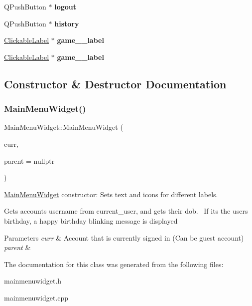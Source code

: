 \begin{DoxyCompactItemize}
Q\+Push\+Button $\ast$ {\bfseries logout}
\item 
\mbox{\label{classMainMenuWidget_a44f2dc5e221e5f2edfeac135b0a54220}} 
Q\+Push\+Button $\ast$ {\bfseries history}
\item 
\mbox{\label{classMainMenuWidget_abf23eb9532e4cbca4a15cc9a17b79b87}} 
\hyperlink{classClickableLabel}{Clickable\+Label} $\ast$ {\bfseries game\+\_\+\_\+label}
\item 
\mbox{\label{classMainMenuWidget_acb10152f41acad8f1bb3d7308e341dcb}} 
\hyperlink{classClickableLabel}{Clickable\+Label} $\ast$ {\bfseries game\+\_\+\_\+label}
\end{DoxyCompactItemize}


\subsection{Constructor \& Destructor Documentation}
\mbox{\label{classMainMenuWidget_abedbc5ac35ef230d4cbcd5ebcffaa780}} 
\subsubsection{\texorpdfstring{Main\+Menu\+Widget()}{MainMenuWidget()}}
{\footnotesize\ttfamily Main\+Menu\+Widget\+::\+Main\+Menu\+Widget (\begin{DoxyParamCaption}\item[{\hyperlink{classAccounts}{Accounts} $\ast$}]{curr,  }\item[{Q\+Widget $\ast$}]{parent = {\ttfamily nullptr} }\end{DoxyParamCaption})\hspace{0.3cm}{\ttfamily [explicit]}}



\hyperlink{classMainMenuWidget}{Main\+Menu\+Widget} constructor\+: Sets text and icons for different labels. 

Gets account\textquotesingle{}s username from current\+\_\+user, and gets their dob.~\newline
If its the user\textquotesingle{}s birthday, a happy birthday blinking message is displayed 
\begin{DoxyParams}{Parameters}
{\em curr} & Account that is currently signed in (Can be guest account) \\
\hline
{\em parent} & \\
\hline
\end{DoxyParams}


The documentation for this class was generated from the following files\+:\begin{DoxyCompactItemize}
\item 
mainmenuwidget.\+h\item 
mainmenuwidget.\+cpp\end{DoxyCompactItemize}

